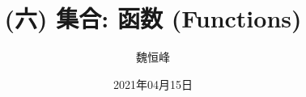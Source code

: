 \documentclass[]{beamer}
\title[(六) 函数 (Functions)]{(六) 集合: 函数 (Functions)}
\author[魏恒峰]{\large 魏恒峰}
\institute{hfwei@nju.edu.cn}
\date{2021年04月15日}
\begin{document}
\maketitle






\thankyou{}

\end{document}
